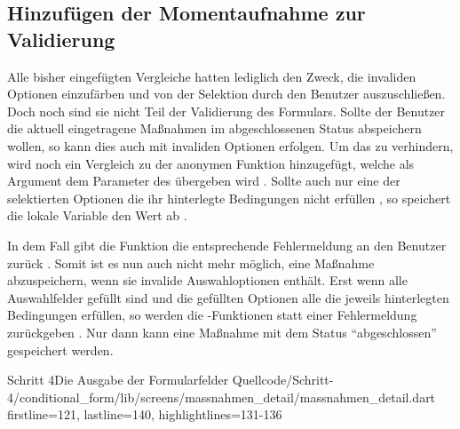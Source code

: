 \subsection{Hinzufügen der Momentaufnahme zur Validierung}

Alle bisher eingefügten Vergleiche hatten lediglich den Zweck,
die invaliden Optionen einzufärben und von der Selektion durch den Benutzer auszuschließen.
Doch noch sind sie nicht Teil der Validierung des Formulars.
Sollte der Benutzer die aktuell eingetragene Maßnahmen im abgeschlossenen Status abspeichern wollen,
so kann dies auch mit invaliden Optionen erfolgen.
Um das zu verhindern,
wird noch ein Vergleich zu der anonymen Funktion hinzugefügt,
welche als Argument dem Parameter  des  übergeben wird \Lst{\ref{lst:Schritt4validator}}.
Sollte auch nur eine der selektierten Optionen  die ihr hinterlegte Bedingungen nicht erfüllen ,
so speichert die lokale Variable  den Wert  ab .

In dem Fall gibt die Funktion die entsprechende Fehlermeldung an den Benutzer zurück .
Somit ist es nun auch nicht mehr möglich,
eine Maßnahme abzuspeichern,
wenn sie invalide Auswahloptionen enthält.
Erst wenn alle Auswahlfelder gefüllt sind
und die gefüllten Optionen alle die jeweils hinterlegten Bedingungen erfüllen,
so werden die -Funktionen  statt einer Fehlermeldung zurückgeben .
Nur dann kann eine Maßnahme mit dem Status \enquote{abgeschlossen} gespeichert werden.


\begin{alexlisting}{Schritt 4}{Die Ausgabe der Formularfelder}
  {Quellcode/Schritt-4/conditional_form/lib/screens/massnahmen_detail/massnahmen_detail.dart}
  {firstline=121, lastline=140, highlightlines={131-136}}
  \label{lst:Schritt4validator}
\end{alexlisting}
